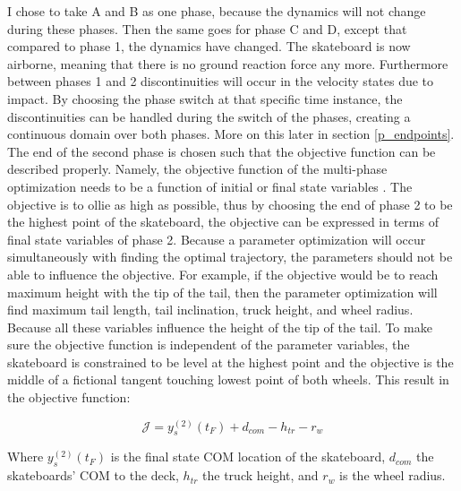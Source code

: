 \noindent I chose to take A and B as one phase, because the dynamics will not change during these phases. Then the same goes for phase C and D, except that compared to phase 1, the dynamics have changed. The skateboard is now airborne, meaning that there is no ground reaction force any more. Furthermore between phases 1 and 2 discontinuities will occur in the velocity states due to impact. By choosing the phase switch at that specific time instance, the discontinuities can be handled during the switch of the phases, creating a continuous domain over both phases. More on this later in section \ref{p_endpoints}. The end of the second phase is chosen such that the objective function can be described properly. Namely, the objective function of the multi-phase optimization needs to be a function of initial or final state variables \cite{brockie_predictive_nodate}. The objective is to ollie as high as possible, thus by choosing the end of phase 2 to be the highest point of the skateboard, the objective can be expressed in terms of final state variables of phase 2. Because a parameter optimization will occur simultaneously with finding the optimal trajectory, the parameters should not be able to influence the objective. For example, if the objective would be to reach maximum height with the tip of the tail, then the parameter optimization will find maximum tail length, tail inclination, truck height, and wheel radius. Because all these variables influence the height of the tip of the tail. To make sure the objective function is independent of the parameter variables, the skateboard is constrained to be level at the highest point and the objective is the middle of a fictional tangent touching lowest point of both wheels. This result in the objective function:

\begin{equation}
    \mathcal{J} = y_s^{(2)}(t_F) + d_{com} - h_{tr} - r_w 
\end{equation}

Where $y_s^{(2)}(t_F)$ is the final state COM location of the skateboard, $d_{com}$ the skateboards' COM to the deck, $h_{tr}$ the truck height, and $r_w$ is the wheel radius.

